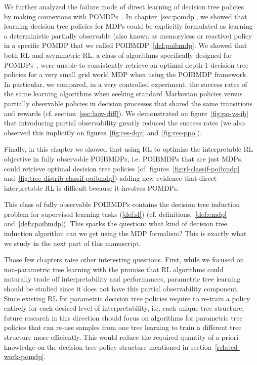 We further analyzed the failure mode of direct learning of decision tree policies by making connexions with POMDPs~\cite{POMDP,chap2}.
In chapter~\ref{sec:pomdp}, we showed that learning decision tree policies for MDPs could be explicitly formulated as learning a deterministic partially observable (also known as memoryless or reactive) policy in a specific POMDP that we called POIBMDP~\ref{def:poibmdp}.
We showed that both RL and asymmetric RL, a class of algorithms specifically designed for POMDPs~\cite{baisero-ppo,baisero-dqn}, were unable to consistently retrieve an optimal depth-1 decision tree policies for a very small grid world MDP when using the POIBMDP framework.
In particular, we compared, in a very controlled experiment, the success rates of the same learning algorithms when seeking standard Markovian policies versus partially observable policies in decision processes that shared the same transitions and rewards (cf. section~\ref{sec:how-diff}).
We demonstrated on figure~\ref{fig:po-vs-ib} that introducing partial observability greatly reduced the success rates (we also observed this implicitly on figures~\ref{fig:res-dqn} and~\ref{fig:res-ppo}).  

Finally, in this chapter we showed that using RL to optimize the interpretable RL objective in fully observable POIBMDPs, i.e. POIBMDPs that are just MDPs, could retrieve optimal decision tree policies (cf. figures~\ref{fig:rl-classif-poibmdp} and~\ref{fig:tree-distrib-classif-poibmdp}) adding new evidence that direct interpretable RL is difficult because it involves POMDPs.

This class of fully observable POIBMDPs contains the decision tree induction problem for supervised learning tasks (\ref{def:sl}) (cf. definitions.~\ref{def:cmdp} and~\ref{def:cpoibmdp}).
This sparks the question: what kind of decision tree induction algorithm can we get using the MDP formalism?
This is exactly what we study in the next part of this manuscript.

Those few chapters raise other interesting questions.
First, while we focused on non-parametric tree learning with the promise that RL algorithms could naturally trade off interpretability and performances, parametric tree learning should be studied since it does not have this partial observability component.
Since existing RL for parametric decision tree policies \cite{silva,vos2024optimizinginterpretabledecisiontree,sympol} require to re-train a policy entirely for each desired level of interpretability, i.e. each unique tree structure, future research in this direction should focus on algorithms for parametric tree policies that can re-use samples from one tree learning to train a different tree structure more efficiently.
This would reduce the required quantity of a priori knowledge on the decision tree policy structure mentioned in section~\ref{related-work-pomdp}.

